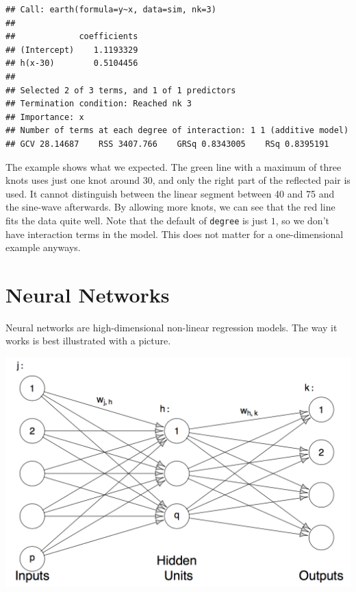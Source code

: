 \documentclass[]{book}
\newenvironment{Shaded}{\begin{snugshade}}{\end{snugshade}}
\newcommand{\KeywordTok}[1]{\textcolor[rgb]{0.13,0.29,0.53}{\textbf{{#1}}}}
\newcommand{\NormalTok}[1]{{#1}}
\begin{document}
\begin{Shaded}
\end{Shaded}

\begin{verbatim}
## Call: earth(formula=y~x, data=sim, nk=3)
## 
##             coefficients
## (Intercept)    1.1193329
## h(x-30)        0.5104456
## 
## Selected 2 of 3 terms, and 1 of 1 predictors
## Termination condition: Reached nk 3
## Importance: x
## Number of terms at each degree of interaction: 1 1 (additive model)
## GCV 28.14687    RSS 3407.766    GRSq 0.8343005    RSq 0.8395191
\end{verbatim}

The example shows what we expected. The green line with a maximum of
three knots uses just one knot around 30, and only the right part of the
reflected pair is used. It cannot distinguish between the linear segment
between 40 and 75 and the sine-wave afterwards. By allowing more knots,
we can see that the red line fits the data quite well. Note that the
default of \texttt{degree} is just \(1\), so we don't have interaction
terms in the model. This does not matter for a one-dimensional example
anyways.

\section{Neural Networks}\label{neural-networks}

Neural networks are high-dimensional non-linear regression models. The
way it works is best illustrated with a picture.

\includegraphics[width=16.81in]{figures/nn}
\end{document}
